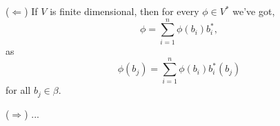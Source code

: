 ($\Leftarrow$) If $V$ is finite dimensional, then for every $\phi \in V^*$ we've got,
$$\phi = \sum_{i=1}^{n} \phi(b_i)b_i^*,$$
as $$\phi(b_j) = \sum_{i=1}^{n} \phi(b_i) b_i^* (b_j)$$ for all $b_j \in \beta$.

($\Rightarrow$) ...